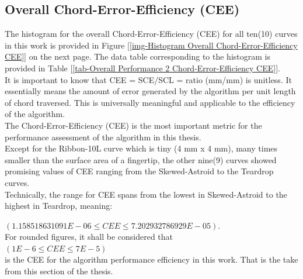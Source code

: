 \clearpage
\pagebreak

\subsection {Overall Chord-Error-Efficiency (CEE) }
\label{chap4-Overall Chord-Error-Efficiency CEE}


The histogram for the overall Chord-Error-Efficiency (CEE) for all ten(10) curves in this work is provided in Figure [\ref{img-Histogram Overall Chord-Error-Efficiency CEE}] on the next page. The data table corresponding to the histogram is provided in Table [\ref{tab-Overall Performance 2 Chord-Error-Efficiency CEE}]. \\


It is important to know that CEE = SCE/SCL = ratio (mm/mm) is unitless. It essentially  means the amount of error generated by the algorithm per unit length of chord traversed. This is universally meaningful and applicable to the efficiency of the algorithm.\\

The Chord-Error-Efficiency (CEE) is the most important metric for the performance assessment of the algorithm in this thesis. \\

Except for the Ribbon-10L curve which is tiny (4 mm x 4 mm), many times smaller than the surface area of a fingertip, the other nine(9) curves showed promising values of CEE ranging from the Skewed-Astroid to the Teardrop curves. \\

Technically, the range for CEE spans from the lowest in Skewed-Astroid to the highest in Teardrop, meaning:

\noindent
$(1.158518631091E-06 \le CEE \le 7.202932786929E-05)$. \\

\noindent
For rounded figures, it shall be considered that \\

\noindent
$(1E-6 \le CEE \le 7E-5)$ \\

\noindent 
is the CEE for the algorithm performance efficiency in this work. That is the take from this section of the thesis.\\


